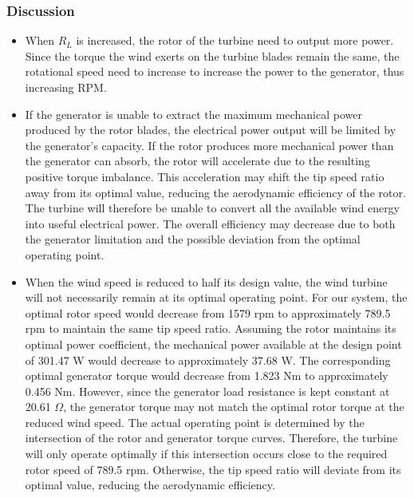 \documentclass[11pt,a4paper]{article}
\begin{document}
\subsubsection{Discussion}
\begin{itemize}
    \item When $R_L$ is increased, the rotor of the turbine need to output more power.
    Since the torque the wind exerts on the turbine blades remain the same, the
    rotational speed need to increase to increase the power to the generator, thus
    increasing RPM.
    \item If the generator is unable to extract the maximum mechanical power produced
    by the rotor blades, the electrical power output will be limited by the
    generator's capacity. If the rotor produces more mechanical power than the generator
    can absorb, the rotor will accelerate due to the resulting positive torque imbalance.
    This acceleration may shift the tip speed ratio away from its optimal value,
    reducing the aerodynamic efficiency of the rotor. The turbine will therefore be
    unable to convert all the available wind energy into useful electrical power.
    The overall efficiency may decrease due to both the generator limitation and the
    possible deviation from the optimal operating point.
    \item When the wind speed is reduced to half its design value, the wind turbine
    will not necessarily remain at its optimal operating point. For our system,
    the optimal rotor speed would decrease from 1579 rpm to approximately 789.5 rpm
    to maintain the same tip speed ratio. Assuming the rotor maintains its optimal
    power coefficient, the mechanical power available at the design point of 301.47 W
    would decrease to approximately 37.68 W. The corresponding optimal generator torque
    would decrease from 1.823 Nm to approximately 0.456 Nm. However, since the generator
    load resistance is kept constant at 20.61 $\Omega$, the generator torque may not match the
    optimal rotor torque at the reduced wind speed. The actual operating point is
    determined by the intersection of the rotor and generator torque curves.
    Therefore, the turbine will only operate optimally if this intersection occurs
    close to the required rotor speed of 789.5 rpm. Otherwise, the tip speed ratio will
    deviate from its optimal value, reducing the aerodynamic efficiency.
\end{itemize}
\end{document}
